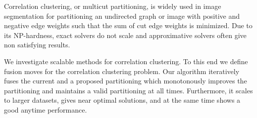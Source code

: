 Correlation clustering, or multicut partitioning,
is widely used in image segmentation for
partitioning an undirected graph or image with positive and negative edge weights 
such that the sum of cut edge weights is minimized.
%
Due to its NP-hardness, exact solvers do not scale and approximative solvers often give non satisfying results.

We investigate scalable methods for correlation clustering.
To this end we define fusion moves for the correlation clustering problem.
Our algorithm iteratively fuses the current and a proposed partitioning which  monotonously improves
the partitioning and maintains a valid partitioning at all times.
Furthermore, it scales to larger datasets, gives near optimal solutions, and at the same time shows
a good anytime performance.
